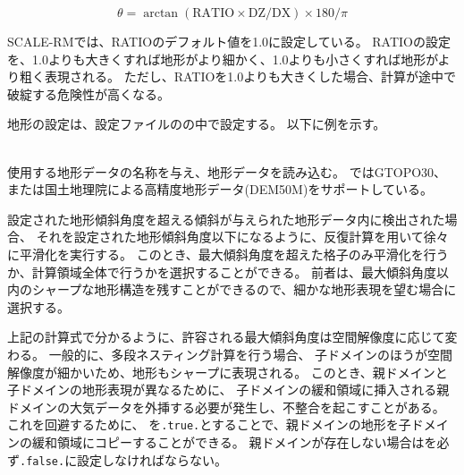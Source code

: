 \[ \theta = \arctan( \mathrm{RATIO} \times \mathrm{DZ}/\mathrm{DX} ) \times 180/\pi \]

SCALE-RMでは、RATIOのデフォルト値を1.0に設定している。
RATIOの設定を、1.0よりも大きくすれば地形がより細かく、1.0よりも小さくすれば地形がより粗く表現される。
ただし、RATIOを1.0よりも大きくした場合、計算が途中で破綻する危険性が高くなる。

地形の設定は、設定ファイルのの中で設定する。
以下に例を示す。\\

\\



使用する地形データの名称を与え、地形データを読み込む。
\scalerm ではGTOPO30、または国土地理院による高精度地形データ(DEM50M)をサポートしている。

設定された地形傾斜角度を超える傾斜が与えられた地形データ内に検出された場合、
それを設定された地形傾斜角度以下になるように、反復計算を用いて徐々に平滑化を実行する。
このとき、最大傾斜角度を超えた格子のみ平滑化を行うか、計算領域全体で行うかを選択することができる。
前者は、最大傾斜角度以内のシャープな地形構造を残すことができるので、細かな地形表現を望む場合に選択する。

上記の計算式で分かるように、許容される最大傾斜角度は空間解像度に応じて変わる。
一般的に、多段ネスティング計算を行う場合、
子ドメインのほうが空間解像度が細かいため、地形もシャープに表現される。
このとき、親ドメインと子ドメインの地形表現が異なるために、
子ドメインの緩和領域に挿入される親ドメインの大気データを外挿する必要が発生し、不整合を起こすことがある。
これを回避するために、
を\verb|.true.|とすることで、親ドメインの地形を子ドメインの緩和領域にコピーすることができる。
親ドメインが存在しない場合はを必ず\verb|.false.|に設定しなければならない。
